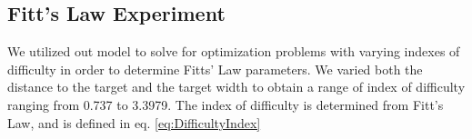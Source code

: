 \documentclass[letterpaper, 10pt, conference]{ieeeconf}
\begin{document}


\subsection{Fitt's Law Experiment}

We utilized out model to solve for optimization problems with varying indexes of difficulty in order to determine Fitts' Law parameters. We varied both the distance to the target and the target width to obtain a range of index of difficulty ranging from 0.737 to 3.3979. The index of difficulty is determined from Fitt's Law, and is defined in eq. \ref{eq:DifficultyIndex}
\end{document}
